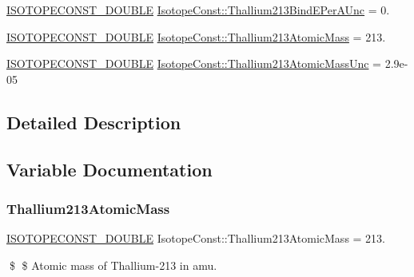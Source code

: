 \begin{DoxyCompactItemize}
\mbox{\hyperlink{group___isotope_const-_macros_ga8f45a7272ce02c0b4c65c44636ed719a}{I\+S\+O\+T\+O\+P\+E\+C\+O\+N\+S\+T\+\_\+\+D\+O\+U\+B\+LE}} \mbox{\hyperlink{group___isotope_const-_thallium-_tl213_ga66a43ade27e282f01a11d721a3368d53}{Isotope\+Const\+::\+Thallium213\+Bind\+E\+Per\+A\+Unc}} = 0.
\item 
\mbox{\hyperlink{group___isotope_const-_macros_ga8f45a7272ce02c0b4c65c44636ed719a}{I\+S\+O\+T\+O\+P\+E\+C\+O\+N\+S\+T\+\_\+\+D\+O\+U\+B\+LE}} \mbox{\hyperlink{group___isotope_const-_thallium-_tl213_ga66d573b4ca9e34bae34413d3f1bc77a0}{Isotope\+Const\+::\+Thallium213\+Atomic\+Mass}} = 213.
\item 
\mbox{\hyperlink{group___isotope_const-_macros_ga8f45a7272ce02c0b4c65c44636ed719a}{I\+S\+O\+T\+O\+P\+E\+C\+O\+N\+S\+T\+\_\+\+D\+O\+U\+B\+LE}} \mbox{\hyperlink{group___isotope_const-_thallium-_tl213_gad2d95503e6e023546cd5a5bf283f19f6}{Isotope\+Const\+::\+Thallium213\+Atomic\+Mass\+Unc}} = 2.\+9e-\/05
\end{DoxyCompactItemize}


\subsection{Detailed Description}


\subsection{Variable Documentation}
\mbox{\label{group___isotope_const-_thallium-_tl213_ga66d573b4ca9e34bae34413d3f1bc77a0}} 
\subsubsection{\texorpdfstring{Thallium213\+Atomic\+Mass}{Thallium213AtomicMass}}
{\footnotesize\ttfamily \mbox{\hyperlink{group___isotope_const-_macros_ga8f45a7272ce02c0b4c65c44636ed719a}{I\+S\+O\+T\+O\+P\+E\+C\+O\+N\+S\+T\+\_\+\+D\+O\+U\+B\+LE}} Isotope\+Const\+::\+Thallium213\+Atomic\+Mass = 213.}

\$ \$ Atomic mass of Thallium-\/213 in amu. \mbox{\label{group___isotope_const-_thallium-_tl213_gad2d95503e6e023546cd5a5bf283f19f6}} 
